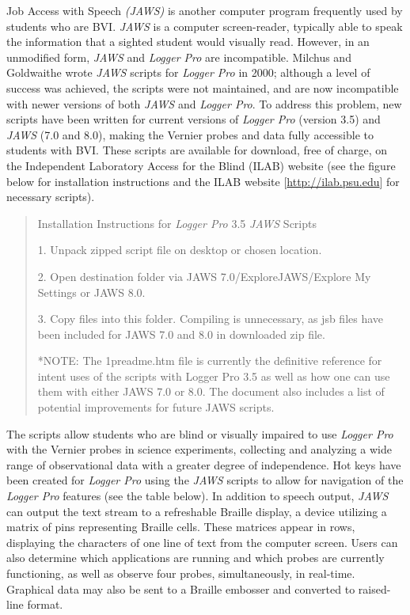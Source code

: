 \documentclass[11.5pt]{sig-alternate} %
\begin{document}
\begin{large}
Job Access with Speech \textit{(JAWS)} is another computer program frequently used by students who are BVI. \textit{JAWS} is a computer screen-reader, typically able to speak the information that a sighted student would visually read. However, in an unmodified form, \textit{JAWS} and \textit{Logger Pro} are incompatible. Milchus and Goldwaithe wrote \textit{JAWS} scripts for \textit{Logger Pro} in 2000; although a level of success was achieved, the scripts were not maintained, and are now incompatible with newer versions of both \textit{JAWS} and \textit{Logger Pro}. To address this problem, new scripts have been written for current versions of \textit{Logger Pro} (version 3.5) and \textit{JAWS} (7.0 and 8.0), making the Vernier probes and data fully accessible to students with BVI. These scripts are available for download, free of charge, on the Independent Laboratory Access for the Blind (ILAB) website (see the figure below for installation instructions and the ILAB website [\url{http://ilab.psu.edu}] for necessary scripts). 
 
\begin{quote}
    Installation Instructions for \textit{Logger Pro} 3.5 \textit{JAWS} Scripts

    1. Unpack zipped script file on desktop or chosen location.

    2. Open destination folder via JAWS 7.0/ExploreJAWS/Explore My Settings or JAWS 8.0.

    3. Copy files into this folder. Compiling is unnecessary, as jsb files have been included for JAWS 7.0 and 8.0 in downloaded zip file.

    *NOTE: The 1preadme.htm file is currently the definitive reference for intent uses of the scripts with Logger Pro 3.5 as well as how one can use them with either JAWS 7.0 or 8.0. The document also includes a list of potential improvements for future JAWS scripts.
\end{quote}
 
The scripts allow students who are blind or visually impaired to use \textit{Logger Pro} with the Vernier probes in science experiments, collecting and analyzing a wide range of observational data with a greater degree of independence. Hot keys have been created for \textit{Logger Pro} using the \textit{JAWS} scripts to allow for navigation of the \textit{Logger Pro} features (see the table below). In addition to speech output, \textit{JAWS} can output the text stream to a refreshable Braille display, a device utilizing a matrix of pins representing Braille cells. These matrices appear in rows, displaying the characters of one line of text from the computer screen. Users can also determine which applications are running and which probes are currently functioning, as well as observe four probes, simultaneously, in real-time. Graphical data may also be sent to a Braille embosser and converted to raised-line format. 
 

\end{large}
\end{document}
